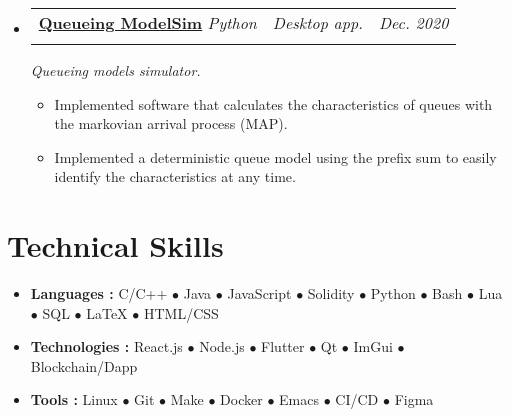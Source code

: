 \documentclass[letterpaper, 11pt]{article}
\makeatletter
\newcommand{\project}[7] {
  \vspace{-1pt}\item
  \begin{tabular*}{0.97\textwidth}[t]{ll@{\extracolsep{\fill}}r}
    #1 \href{#4}{\textbf{\color{RoyalBlue}#2}}
    \textbar{} \textit{\small#5} \textbar{ } & \textit{\footnotesize#7} & \textit{\small #3} \\
    \vspace{-10pt}
  \end{tabular*}
  \textit{\small #6}
  \vspace{-8pt}
}
\newcommand{\subproject}[1] {
\item\small
  {#1}
  \vspace{-2pt}
}
\newcommand{\technicalskill}[3] {
  \vspace{-1pt}
\item\small
  #1 \textbf{#2 : }{\footnotesize{#3}}
  \vspace{-2pt}
}
\newcommand{\bulletitem}[1] {{\tiny$\bullet$} #1}
\makeatother
\begin{document}
\begin{itemize}[leftmargin=*]
  \project
  {\faIcon{user-clock}}
  {Queueing ModelSim}{Dec. 2020}
  {https://github.com/AbdeltwabMF/Queueing-ModelSim}{Python}
  {Queueing models simulator.}{Desktop app.}

  \begin{itemize}
    \subproject
    {Implemented software that calculates the characteristics of queues with the markovian arrival process (MAP).}
    \subproject
    {Implemented a deterministic queue model using the prefix sum to easily identify the characteristics at any time.}
  \end{itemize}\vspace{-4pt}
\end{itemize}

\section{Technical Skills}
\begin{itemize}[leftmargin=*]
  \technicalskill
  {}{Languages}
	{C/C++ \bulletitem{Java} \bulletitem{JavaScript} \bulletitem{Solidity} \bulletitem{Python} \bulletitem{Bash} \bulletitem{Lua} \bulletitem{SQL} \bulletitem{\LaTeX{}} \bulletitem{HTML/CSS}}

  \technicalskill
  {}{Technologies}
	{React.js \bulletitem{Node.js} \bulletitem{Flutter} \bulletitem{Qt} \bulletitem{ImGui} \bulletitem{Blockchain/Dapp}}

  \technicalskill
  {}{Tools}
  {Linux \bulletitem{Git} \bulletitem{Make} \bulletitem{Docker} \bulletitem{Emacs} \bulletitem{CI/CD} \bulletitem{Figma}}
\end{itemize}
\end{document}
